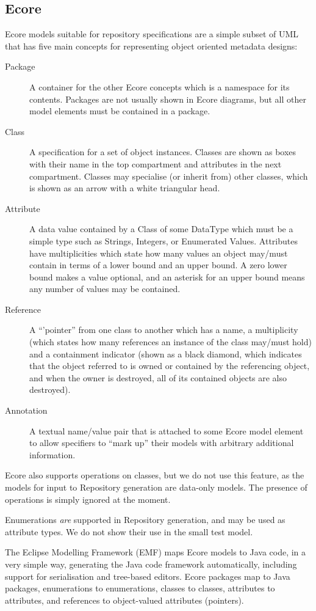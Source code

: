 \documentclass[11pt]{article}
\begin{document}
\subsection{Ecore}
Ecore models suitable for repository specifications are a simple subset of UML that has five main concepts for representing object oriented metadata designs:
\begin{description}
\item[Package] A container for the other Ecore concepts which is a namespace for its contents. Packages are not usually shown in Ecore diagrams, but all other model elements must be contained in a package.
\item[Class] A specification for a set of object instances. Classes are shown as boxes with their name in the top compartment and attributes in the next compartment. Classes may specialise (or inherit from) other classes, which is shown as an arrow with a white triangular head. 
\item[Attribute] A data value contained by a Class of some DataType which must be a simple type such as Strings, Integers, or Enumerated Values. Attributes have multiplicities which state how many values an object may/must contain in terms of a lower bound and an upper bound. A zero lower bound makes a value optional, and an asterisk for an upper bound means any number of values may be contained.
\item[Reference] A ``'pointer'' from one class to another which has a name, a multiplicity (which states how many references an instance of the class may/must hold) and a containment indicator (shown as a black diamond, which indicates that the object referred to is owned or contained by the referencing object, and when the owner is destroyed, all of its contained objects are also destroyed).
\item[Annotation] A textual name/value pair that is attached to some Ecore model element to allow specifiers to ``mark up'' their models with arbitrary additional information.
\end{description}

Ecore also supports operations on classes, but we do not use this feature, as the models for input to Repository generation are data-only models. The presence of operations is simply ignored at the moment. 

Enumerations {\em are} supported in Repository generation, and may be used as attribute types. We do not show their use in the small test model. 

The Eclipse Modelling Framework (EMF) maps Ecore models to Java code, in a very simple way, generating the Java code framework automatically, including support for serialisation and tree-based editors.  Ecore packages map to Java packages, enumerations to enumerations, classes to classes, attributes to attributes, and references to object-valued attributes (pointers).
\end{document}
